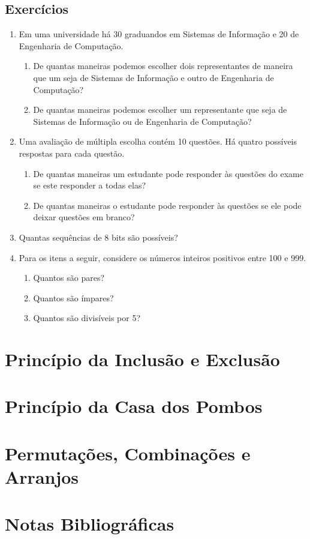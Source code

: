 \subsection{Exercícios}

\begin{enumerate}
   \item Em uma universidade há 30 graduandos em Sistemas de
     Informação e 20 de Engenharia de Computação.
   \begin{enumerate}
       \item De quantas maneiras podemos escolher dois representantes
         de maneira que um seja de Sistemas de Informação e outro de
         Engenharia de Computação?
      \item De quantas maneiras podemos escolher um representante que
        seja de Sistemas de Informação ou de Engenharia de Computação?
   \end{enumerate}
   \item Uma avaliação de múltipla escolha contém 10 questões. Há
     quatro possíveis respostas para cada questão.
     \begin{enumerate}
         \item De quantas maneiras um estudante pode responder às
           questões do exame se este responder a todas elas?
        \item De quantas maneiras o estudante pode responder às
          questões se ele pode deixar questões em branco?
     \end{enumerate}
     \item Quantas sequências de 8 bits são possíveis?
     \item Para os itens a seguir, considere os números inteiros
       positivos entre 100 e 999.
       \begin{enumerate}
         \item Quantos são pares?
         \item Quantos são ímpares?
         \item Quantos são divisíveis por 5?
       \end{enumerate}
\end{enumerate}

\section{Princípio da Inclusão e Exclusão}

\section{Princípio da Casa dos Pombos}

\section{Permutações, Combinações e Arranjos}

\section{Notas Bibliográficas}